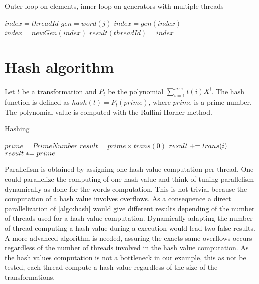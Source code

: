 {\begin{algorithm}
\caption{Outer loop on elements, inner loop on generators with multiple threads}
\label{algo:composepar}
\begin{algorithmic}
\STATE $index = threadId$
\STATE $gen = word(j)$
\STATE $index = gen(index)$
\ENDFOR
\STATE $index = newGen(index)$
\STATE $result(threadId) = index$
\ENDIF
\end{algorithmic}
\end{algorithm}


\section{Hash algorithm}
\label{part:hash}
Let $t$ be a transformation and $P_{t}$ be the polynomial $\displaystyle\sum_{i=1}^{size} t(i)X^i$. The hash function is defined as $hash(t) = P_{t}(prime)$, where $prime$ is a prime number.
The polynomial value is computed with the Ruffini-Horner method.
\begin{algorithm}
\caption{Hashing}
\label{algo:hash}
\begin{algorithmic}
\STATE $prime = PrimeNumber$
\STATE $result = prime \times trans(0)$
\STATE $\switch result += trans(i)$
\STATE $\switch result *= prime$
\ENDFOR
\end{algorithmic}
\end{algorithm}
Parallelism is obtained by assigning one hash value computation per thread.
One could parallelize the computing of one hash value and think of tuning parallelism dynamically as done for the words computation. This is not trivial because the computation of a hash value involves overflows. As a consequence a direct parallelization of \autoref{algo:hash} would give different results depending of the number of threads used for a hash value computation. Dynamically adapting the number of thread computing a hash value during a execution would lead two false results. A more advanced algorithm is needed, assuring the exacts same overflows occurs regardless of the number of threads involved in the hash value computation. As the hash values computation is not a bottleneck in our example, this as not be tested, each thread compute a hash value regardless of the size of the transformations.


}
